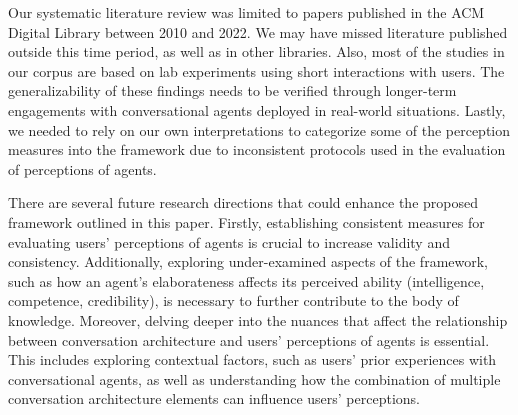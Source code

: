 Our systematic literature review was limited to papers published in the ACM Digital Library between 2010 and 2022. We may have missed literature published outside this time period, as well as in other libraries. Also, most of the studies in our corpus are based on lab experiments using short interactions with users. The generalizability of these findings needs to be verified through longer-term engagements with conversational agents deployed in real-world situations. 
Lastly, we needed to rely on our own interpretations to categorize some of the perception measures into the framework due to inconsistent protocols used in the evaluation of perceptions of agents.

There are several future research directions that could enhance the proposed framework outlined in this paper. Firstly, establishing consistent measures for evaluating users' perceptions of agents is crucial to increase validity and consistency. Additionally, exploring under-examined aspects of the framework, such as how an agent's elaborateness affects its perceived ability (intelligence, competence, credibility), is necessary to further contribute to the body of knowledge. Moreover, delving deeper into the nuances that affect the relationship between conversation architecture and users' perceptions of agents is essential. This includes exploring contextual factors, such as users' prior experiences with conversational agents, as well as understanding how the combination of multiple conversation architecture elements can influence users' perceptions.
